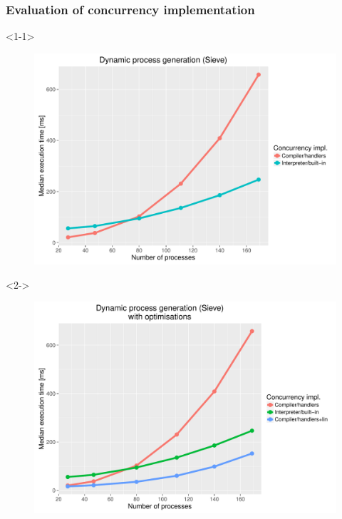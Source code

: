 \documentclass[10pt,compress]{beamer}
\begin{document}
\begin{frame}
  \frametitle{Evaluation of concurrency implementation}
\begin{onlyenv}<1-1>
  \begin{figure}
    \centering
    \includegraphics[scale=0.45]{figures/sieve_compiler-interpreter.pdf}
  \end{figure}
\end{onlyenv}
%
\begin{onlyenv}<2->
  \begin{figure}
    \centering
    \includegraphics[scale=0.45]{figures/sieve_recovered.pdf}
  \end{figure}
\end{onlyenv}
\end{frame}
\end{document}

